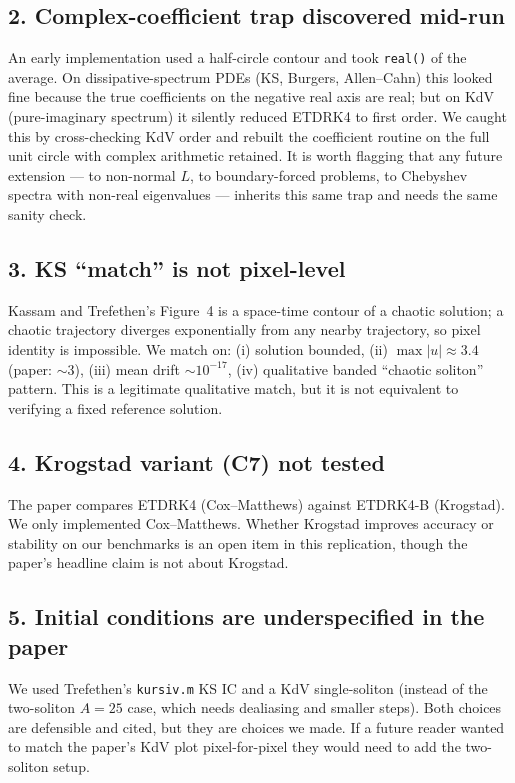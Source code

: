 \documentclass[11pt]{article}
\begin{document}
\subsection*{2. Complex-coefficient trap discovered mid-run}
An early implementation used a half-circle contour and took \texttt{real()}
of the average. On dissipative-spectrum PDEs (KS, Burgers, Allen--Cahn)
this looked fine because the true coefficients on the negative real axis
are real; but on KdV (pure-imaginary spectrum) it silently reduced ETDRK4
to first order. We caught this by cross-checking KdV order and rebuilt
the coefficient routine on the full unit circle with complex arithmetic
retained. It is worth flagging that any future extension --- to
non-normal $L$, to boundary-forced problems, to Chebyshev spectra with
non-real eigenvalues --- inherits this same trap and needs the same
sanity check.

\subsection*{3. KS ``match'' is not pixel-level}
Kassam and Trefethen's Figure~4 is a space-time contour of a chaotic
solution; a chaotic trajectory diverges exponentially from any nearby
trajectory, so pixel identity is impossible. We match on: (i) solution
bounded, (ii) $\max|u|\approx 3.4$ (paper: $\sim 3$), (iii) mean drift
$\sim 10^{-17}$, (iv) qualitative banded ``chaotic soliton'' pattern.
This is a legitimate qualitative match, but it is not equivalent to
verifying a fixed reference solution.

\subsection*{4. Krogstad variant (C7) not tested}
The paper compares ETDRK4 (Cox--Matthews) against ETDRK4-B
(Krogstad). We only implemented Cox--Matthews. Whether Krogstad
improves accuracy or stability on our benchmarks is an open item
in this replication, though the paper's headline claim is not
about Krogstad.

\subsection*{5. Initial conditions are underspecified in the paper}
We used Trefethen's \texttt{kursiv.m} KS IC and a KdV single-soliton
(instead of the two-soliton $A{=}25$ case, which needs dealiasing and
smaller steps). Both choices are defensible and cited, but they are
choices we made. If a future reader wanted to match the paper's KdV
plot pixel-for-pixel they would need to add the two-soliton setup.
\end{document}
